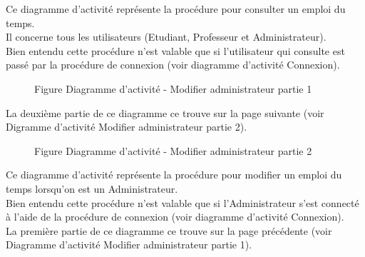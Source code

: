 \documentclass[a4paper, 11pt]{article}
\begin{document}
        Ce diagramme d'activité représente la procédure pour consulter un emploi du temps.\\
        Il concerne tous les utilisateurs (Etudiant, Professeur et Administrateur).\\
        Bien entendu cette procédure n'est valable que si l'utilisateur qui consulte est passé par la procédure de connexion (voir diagramme d'activité Connexion).
        \clearpage
        \begin{figure}[h]
        \caption{Figure Diagramme d'activité - Modifier administrateur partie 1}
        \label{fig-diag-activite-modifier-admin-part1}
        \end{figure}
        La deuxième partie de ce diagramme ce trouve sur la page suivante (voir Digramme d'activité Modifier administrateur partie 2).
        \clearpage
        \begin{figure}[h]
        \caption{Figure Diagramme d'activité - Modifier administrateur partie 2}
        \label{fig-diag-activite-modifier-admin-part2}
        \end{figure}
        Ce diagramme d'activité représente la procédure pour modifier un emploi du temps lorsqu'on est un Administrateur.\\
        Bien entendu cette procédure n'est valable que si l'Administrateur s'est connecté à l'aide de la procédure de connexion (voir diagramme d'activité Connexion).\\
        La première partie de ce diagramme ce trouve sur la page précédente (voir Diagramme d'activité Modifier administrateur partie 1).
	\clearpage
\end{document}
